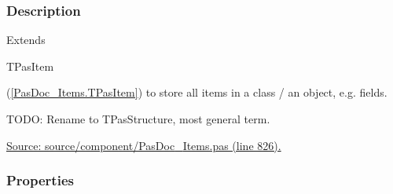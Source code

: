 \documentclass{report}
\begin{document}
\subsubsection*{\large{\textbf{Description}}\normalsize\hspace{1ex}\hfill}
Extends \begin{ttfamily}TPasItem\end{ttfamily}(\ref{PasDoc_Items.TPasItem}) to store all items in a class / an object, e.g. fields.\hfill\vspace*{1ex}



TODO: Rename to TPasStructure, most general term.\par
\href{https://github.com/pasdoc/pasdoc/blob/master/source/component/PasDoc_Items.pas#L826}{Source: source/component/PasDoc{\_}Items.pas (line 826).}\subsubsection*{\large{\textbf{Properties}}\normalsize\hspace{1ex}\hfill}
\end{document}
